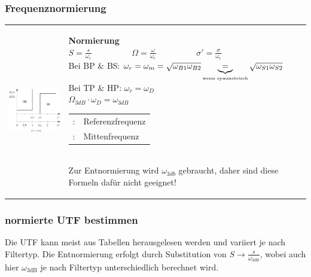 \subsubsection{Frequenznormierung }
\label{frequenznormierung}
\begin{tabular}{ll}
\parbox{6cm}{
	\includegraphics[width=5cm]{./images/filter-freqnormierung.png}}
& \parbox{12cm}{
	\textbf{Normierung} \\
	$\boxed{S=\frac{s}{\omega_{r}} \hspace{2cm} \Omega=\frac{\omega}{\omega_{r}} 
  \hspace{2cm} \sigma'=\frac{\sigma}{\omega_{r}}}$\\ 

	Bei BP \& BS: $\omega_r = \omega_m =\sqrt{\omega_{B1} \omega_{B2}}
	\underbrace{=}_{\text{\tiny{wenn symmetrisch}}} \sqrt{\omega_{S1} \omega_{S2}}$ \\
	
  Bei TP \& HP: $\omega_r = \omega_D$ \\
  
  $\boxed{\Omega_{3dB} \cdot \omega_D = \omega_{3dB}}$

  \begin{tabular}{ll}
    $\omega_r$: & Referenzfrequenz \\
    $\omega_m$: & Mittenfrequenz
  \end{tabular} \\
  Zur Entnormierung wird $\omega_{3db}$ gebraucht, daher sind diese Formeln
	dafür nicht geeignet! \\
	}
\end{tabular}

\subsubsection{normierte UTF bestimmen}
\label{UTF bestimmen}
Die UTF kann meist aus Tabellen herausgelesen werden und variiert je nach
Filtertyp. Die Entnormierung erfolgt durch Substitution von $S \longrightarrow
\displaystyle\frac{s}{\omega_{\text{3dB}}}$, wobei auch hier
$\omega_{\text{3dB}}$ je nach Filtertyp unterschiedlich berechnet wird.


